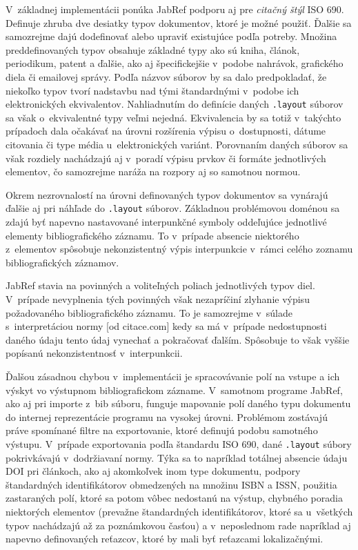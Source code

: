 \documentclass{fithesis3}
\begin{document}
	V~základnej implementácii ponúka JabRef podporu aj pre \textit{citačný štýl} ISO 690. Definuje zhruba dve desiatky typov dokumentov, ktoré je možné použiť. Ďalšie sa samozrejme dajú dodefinovať alebo upraviť existujúce podľa potreby. Množina preddefinovaných typov obsahuje základné typy ako sú kniha, článok, periodikum, patent a ďalšie, ako aj špecifickejšie v~podobe nahrávok, grafického diela či emailovej správy. Podľa názvov súborov by sa dalo predpokladať, že niekoľko typov tvorí nadstavbu nad tými štandardnými v~podobe ich elektronických ekvivalentov. Nahliadnutím do definície daných \texttt{.layout} súborov sa však o~ekvivalentné typy veľmi nejedná. Ekvivalencia by sa totiž v~takýchto prípadoch dala očakávať na úrovni rozšírenia výpisu o~dostupnosti, dátume citovania či type média u~elektronických variánt. Porovnaním daných súborov sa však rozdiely nachádzajú aj v~poradí výpisu prvkov či formáte jednotlivých elementov, čo samozrejme naráža na rozpory aj so samotnou normou.
	
	Okrem nezrovnalostí na úrovni definovaných typov dokumentov sa vynárajú ďalšie aj pri náhľade do \texttt{.layout} súborov. Základnou problémovou doménou sa zdajú byť napevno nastavované interpunkčné symboly oddeľujúce jednotlivé elementy bibliografického záznamu. To v~prípade absencie niektorého z~elementov spôsobuje nekonzistentný výpis interpunkcie v~rámci celého zoznamu bibliografických záznamov.
	
	JabRef stavia na povinných a voliteľných poliach jednotlivých typov diel. V~prípade nevyplnenia tých povinných však nezapríčiní zlyhanie výpisu požadovaného bibliografického záznamu. To je samozrejme v~súlade s~interpretáciou normy [od citace.com] kedy sa má v~prípade nedostupnosti daného údaju tento údaj vynechať a pokračovať ďalším. Spôsobuje to však vyššie popísanú nekonzistentnosť v~interpunkcii.
	
	Ďalšou zásadnou chybou v~implementácii je spracovávanie polí na vstupe a ich výskyt vo výstupnom bibliografickom zázname. V~samotnom programe JabRef, ako aj pri importe z~bib súboru, funguje mapovanie polí daného typu dokumentu do internej reprezentácie programu na vysokej úrovni. Problémom zostávajú práve spomínané filtre na exportovanie, ktoré definujú podobu samotného výstupu. V~prípade exportovania podľa štandardu ISO 690, dané \texttt{.layout} súbory pokrivkávajú v~dodržiavaní normy. Týka sa to napríklad totálnej absencie údaju DOI pri článkoch, ako aj akomkoľvek inom type dokumentu, podpory štandardných identifikátorov obmedzených na množinu ISBN a ISSN, použitia zastaraných polí, ktoré sa potom vôbec nedostanú na výstup, chybného poradia niektorých elementov (prevažne štandardných identifikátorov, ktoré sa u~všetkých typov nachádzajú až za poznámkovou časťou) a v~neposlednom rade napríklad aj napevno definovaných reťazcov, ktoré by mali byť reťazcami lokalizačnými.
	
\end{document}
